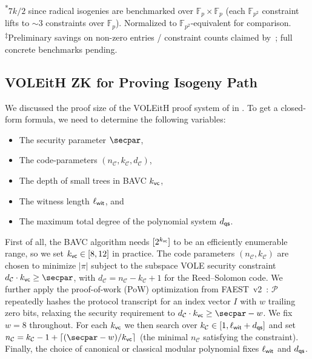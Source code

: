 \documentclass[11pt,a4paper]{article}
\theoremstyle{definition}
\theoremstyle{remark}
\newcommand{\F}{\mathbb{F}}
\newcommand{\calC}{\mathcal{C}}
\newcommand{\calP}{\mathcal{P}}
\begin{document}
\begin{table}[H]
	\smallskip
	{\footnotesize \textsuperscript{*}$7k / 2$ since radical isogenies are
	benchmarked over $\F_p \times \F_p$ (each $\F_{p^2}$ constraint lifts to
	$\sim 3$ constraints over $\F_p$). Normalized to $\F_{p^2}$-equivalent
	for comparison. \\
	\textsuperscript{$\ddagger$}Preliminary savings on non-zero entries /
	constraint counts claimed by~\cite{AtkinWeber26}; full concrete benchmarks
	pending.}
\end{table}



\subsection{VOLEitH ZK for Proving Isogeny Path}

We discussed the proof size of the VOLEitH proof system of  in .
To get a closed-form formula, we need to determine the following variables:
\begin{itemize}
	\item The security parameter $\secpar$,
	\item The code-parameters $(n_{\calC}, k_{\calC}, d_{\calC})$,
	\item The depth of small trees in BAVC $k_{\sf vc}$,
	\item The witness length $\ell_{\sf wit}$, and
	\item The maximum total degree of the polynomial system $d_{\sf qs}$.
\end{itemize}

First of all, the BAVC algorithm needs $[2^{k_{\sf vc}}]$ to be an efficiently
enumerable range, so we set $k_{\sf vc} \in [8, 12]$ in practice.
The code parameters $(n_{\calC}, k_{\calC})$ are chosen to minimize $|\pi|$
subject to the subspace VOLE security constraint
$d_{\calC} \cdot k_{\sf vc} \geq \secpar$, with
$d_{\calC} = n_{\calC} - k_{\calC} + 1$ for the Reed--Solomon code.
We further apply the proof-of-work (PoW) optimization from
FAEST~v2~\cite{faestv2}: $\calP$ repeatedly hashes the protocol transcript 
for an index vector $I$ with $w$ trailing zero bits, 
relaxing the security requirement to
$d_{\calC} \cdot k_{\sf vc} \geq \secpar - w$.  We fix $w = 8$ throughout.
For each $k_{\sf vc}$ we then search over $k_{\calC} \in [1, \ell_{\sf wit}
+ d_{\sf qs}]$ and set $n_{\calC} = k_{\calC} - 1 + \lceil (\secpar - w) /
k_{\sf vc} \rceil$ (the minimal $n_{\calC}$ satisfying the constraint).
Finally, the choice of canonical or classical modular polynomial fixes
$\ell_{\sf wit}$ and $d_{\sf qs}$.
\end{document}
